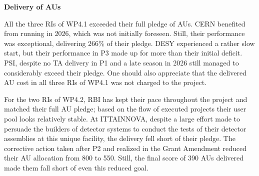 \textbf{{Delivery of AUs}}


All the three RIs of WP4.1 exceeded their full pledge of AUs. CERN benefited from running in 2026, which was not initially foreseen. Still, their performance was exceptional, delivering 266\% of their pledge. DESY experienced a rather slow start, but their performance in P3 made up for more than their initial deficit. PSI, despite no TA delivery in P1 and a late season in 2026 still managed to considerably exceed their pledge. One should also appreciate that the delivered AU cost in all three RIs of WP4.1 was not charged to the project.



For the two RIs of WP4.2, RBI has kept their pace throughout the project and matched their full AU pledge; based on the flow of executed projects their user pool looks relatively stable. At ITTAINNOVA, despite a large effort made to persuade the builders of detector systems to conduct the tests of their detector assemblies at this unique facility, the delivery fell short of their pledge. The corrective action taken after P2 and realized in the Grant Amendment reduced their AU allocation from 800 to 550. Still, the final score of 390 AUs delivered made them fall short of even this reduced goal.

